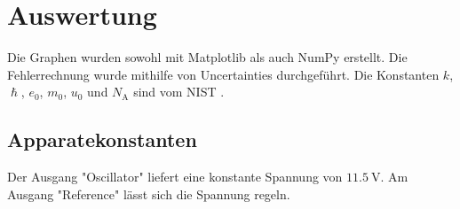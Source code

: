 \section{Auswertung}
\label{sec:Auswertung}


Die Graphen wurden sowohl mit Matplotlib \cite{matplotlib} als auch NumPy \cite{numpy} erstellt. Die
Fehlerrechnung wurde mithilfe von Uncertainties \cite{uncertainties} durchgeführt.
Die Konstanten $k$, $\hslash$, $e_0$, $m_0$, $u_0$ und $N_\text{A}$ sind vom NIST \cite{nistgov}.

\subsection{Apparatekonstanten}
Der Ausgang "Oscillator" liefert eine konstante Spannung von $\SI{11,5}{\volt}$.
Am Ausgang "Reference" lässt sich die Spannung regeln.

